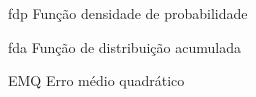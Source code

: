 \begin{basedescript}{\desclabelstyle{\pushlabel}\desclabelwidth{6em}}
\item[{fdp}] Função densidade de probabilidade%
\item[{fda}] Função de distribuição acumulada%
\item[{EMQ}] Erro médio quadrático%
\end{basedescript}